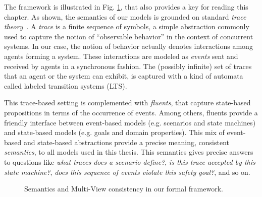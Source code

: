 The framework is illustrated in Fig. \ref{image:framework}, that also provides a key for reading this chapter. As shown, the semantics of our models is grounded on standard \emph{trace theory}~\cite{Hoare:1985}. A \emph{trace} is a finite sequence of symbols, a simple abstraction commonly used to capture the notion of ``observable behavior'' in the context of concurrent systems. In our case, the notion of behavior actually denotes interactions among agents forming a system. These interactions are modeled as \emph{events} sent and received by agents in a synchronous fashion. The (possibly infinite) set of traces that an agent or the system can exhibit, is captured with a kind of automata called labeled transition systems (LTS).

This trace-based setting is complemented with \emph{fluents}, that capture state-based propositions in terms of the occurrence of events. Among others, fluents provide a friendly interface between event-based models (e.g. scenarios and state machines) and state-based models (e.g. goals and domain properties). This mix of event-based and state-based abstractions provide a precise meaning, consistent \emph{semantics}, to all models used in this thesis. This semantics gives precise answers to questions like \emph{what traces does a scenario define?}, \emph{is this trace accepted by this state machine?}, \emph{does this sequence of events violate this safety goal?}, and so on.

\begin{figure}[t]\centering
  \caption{Semantics and Multi-View consistency in our formal framework.\label{image:framework}}
\end{figure}

